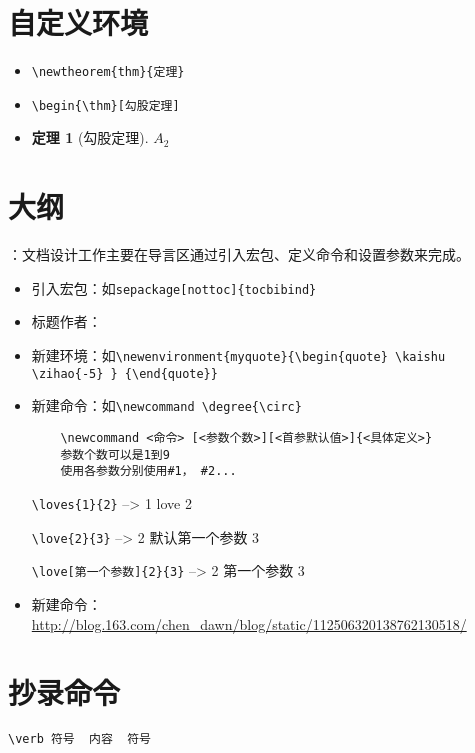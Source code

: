 \documentclass[UTF8,a4paper,8pt]{ctexart}
\newtheorem{thm}{定理}
\newcommand \loves[2]{#1 love #2}
\newcommand \love[3][默认第一个参数]{#2 #1 #3}
\begin{document}
\section{自定义环境}
		\begin{itemize}
			\item  \verb|\newtheorem{thm}{定理}|
			\item  \verb|\begin{\thm}[勾股定理]|
			\item  	\begin{thm}[勾股定理]
				$A_2$
			\end{thm}	
		\end{itemize}
\section{大纲}：文档设计工作主要在导言区通过引入宏包、定义命令和设置参数来完成。
		\begin{itemize}
			\item 引入宏包：如\verb|sepackage[nottoc]{tocbibind}|
			\item 标题作者：
			\item 新建环境：如\verb|\newenvironment{myquote}{\begin{quote} \kaishu \zihao{-5} } {\end{quote}}|
			
			\item 新建命令：如\verb|\newcommand \degree{\circ}|
				\begin{lstlisting}
	\newcommand <命令> [<参数个数>][<首参默认值>]{<具体定义>}
	参数个数可以是1到9
	使用各参数分别使用#1， #2...
				\end{lstlisting}
			
			\verb|\loves{1}{2}| --> \loves{1}{2}
			
			\verb|\love{2}{3}| --> \love{2}{3}
			
			\verb|\love[第一个参数]{2}{3}| --> \love[第一个参数]{2}{3}
			
			\item 新建命令：\url{http://blog.163.com/chen_dawn/blog/static/112506320138762130518/}
			
		\end{itemize}                                                               
		
\section{抄录命令}
	  \verb|\verb 符号  内容  符号|
	   
\end{document}
